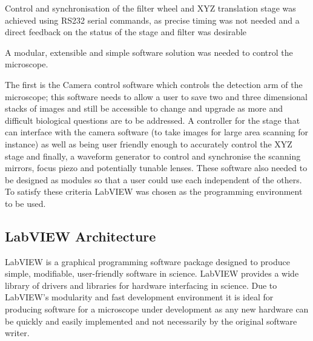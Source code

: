 Control and synchronisation of the filter wheel and XYZ translation stage was achieved using RS232 serial commands, as precise timing was not needed and a direct feedback on the status of the stage and filter was desirable %

%



A modular, extensible and simple software solution was needed to control the microscope.

The first is the Camera control software which controls the detection arm of the microscope; this software needs to allow a user to save two and three dimensional stacks of images and still be accessible to change and upgrade as more and difficult biological questions are to be addressed.
A controller for the stage that can interface with the camera software (to take images for large area scanning for instance) as well as being user friendly enough to accurately control the XYZ stage and finally, a waveform generator to control and synchronise the scanning mirrors, focus piezo and potentially tunable lenses.
These software also needed to be designed as modules so that a user could use each independent of the others.
To satisfy these criteria LabVIEW was chosen as the programming environment to be used.

\subsection{LabVIEW Architecture}

LabVIEW is a graphical programming software package designed to produce simple, modifiable, user-friendly software in science.
LabVIEW provides a wide library of drivers and libraries for hardware interfacing in science.
Due to LabVIEW's modularity and fast development environment it is ideal for producing software for a microscope under development as any new hardware can be quickly and easily implemented and not necessarily by the original software writer.

